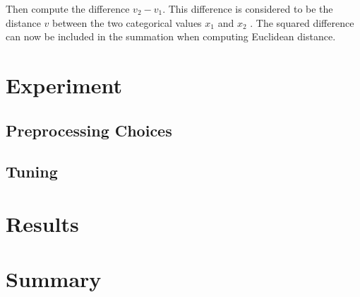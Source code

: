 \documentclass[twoside,11pt]{article}
\begin{document}
Then compute the difference
$v_2 - v_1$.
This difference is considered to be the distance $v$ between the two categorical values $x_1$ and $x_2$ \citep{vdm}. The squared difference can now be included in the summation when computing Euclidean distance.

\section{Experiment}

\subsection{Preprocessing Choices}

\subsection{Tuning}

\section{Results}

\section{Summary}



\end{document}
